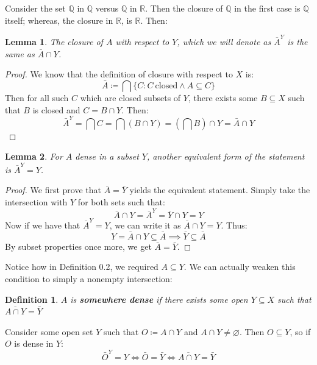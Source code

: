\documentclass[10pt,letterpaper]{article} %
\newtheorem{lem}{Lemma}[section]
\newtheorem{defn}{Definition}[section]
\begin{document}
Consider the set $\mathbb{Q}$ in $\mathbb{Q}$ versus $\mathbb{Q}$ in $\mathbb{R}$. Then the closure of $\mathbb{Q}$ in the first case is $\mathbb{Q}$ itself; whereas, the closure in $\mathbb{R}$, is $\mathbb{R}$. Then:
\begin{lem}
The closure of $A$ with respect to $Y$, which we will denote as $\overline{A}^Y$ is the same as $\bar{A} \cap Y$.
\end{lem}
\begin{proof}
We know that the definition of closure with respect to $X$ is:
\begin{equation*}
  \bar{A} \coloneq \bigcap \{C: C \ \text{closed} \land A \subseteq C\}
\end{equation*}
Then for all such $C$ which are closed subsets of $Y$, there exists some $B \subseteq X$ such that $B$ is closed and $C = B \cap Y$. Then:
\begin{equation*}
  \bar{A}^Y = \bigcap C = \bigcap (B \cap Y) = \left(\bigcap B\right) \cap Y = \bar{A} \cap Y
\end{equation*}
\end{proof}
\begin{lem}
For $A$ dense in a subset $Y$, another equivalent form of the statement is $\bar{A}^Y = Y$.
\end{lem}
\begin{proof}
We first prove that $\bar{A} = \bar{Y}$ yields the equivalent statement. Simply take the intersection with $Y$ for both sets such that:
\begin{equation*}
  \bar{A} \cap Y = \bar{A}^Y = \bar{Y} \cap Y = Y
\end{equation*}
Now if we have that $\bar{A}^Y = Y$, we can write it as $\bar{A} \cap Y = Y$. Thus:
\begin{equation*}
  Y = \bar{A} \cap Y \subseteq \bar{A} \implies \bar{Y} \subseteq \bar{A}
\end{equation*}
By subset properties once more, we get $\bar{A} = \bar{Y}$.
\end{proof}
Notice how in Definition 0.2, we required $A \subseteq Y$. We can actually weaken this condition to simply a nonempty intersection:
\begin{defn}
$A$ is \textbf{somewhere dense} if there exists some open $Y \subseteq X$ such that $\overline{A \cap Y} = \bar{Y}$
\end{defn}
Consider some open set $Y$ such that $O \coloneq A \cap Y$ and $A \cap Y \neq \varnothing$. Then $O \subseteq Y$, so if $O$ is dense in $Y$:
\begin{equation*}
  \bar{O}^Y = Y \iff \bar{O} = \bar{Y} \iff \overline{A \cap Y} = \bar{Y}
\end{equation*}
\end{document}
